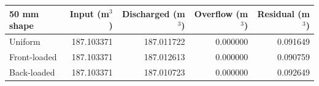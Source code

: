 \begin{tabular}{lrrrr}
\toprule
50 mm shape & Input (m$^3$) & Discharged (m$^3$) & Overflow (m$^3$) & Residual (m$^3$) \\
\midrule
Uniform & 187.103371 & 187.011722 & 0.000000 & 0.091649 \\
Front-loaded & 187.103371 & 187.012613 & 0.000000 & 0.090759 \\
Back-loaded & 187.103371 & 187.010723 & 0.000000 & 0.092649 \\
\bottomrule
\end{tabular}

